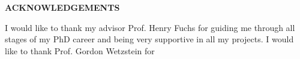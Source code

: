 
\begin{center}
\vspace*{52pt}
{\Large \textbf{ACKNOWLEDGEMENTS}}
\end{center}

I would like to thank my advisor Prof. Henry Fuchs for guiding me through all stages of my PhD career and being very supportive in all my projects. I would like to thank Prof. Gordon Wetzstein for 



\clearpage 

